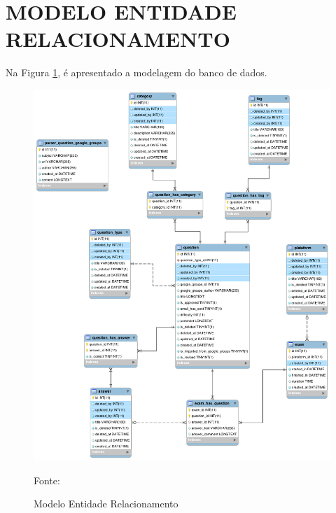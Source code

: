 \section{MODELO ENTIDADE RELACIONAMENTO}

Na Figura \ref{fig:modeloEntidadeRelacionamento}, é apresentado a modelagem do
banco de dados.

\begin{figure}[h!tb]
	\caption{Modelo Entidade Relacionamento}
	\label{fig:modeloEntidadeRelacionamento}

	\centering
	\includegraphics[width=\textwidth]{images/zcpe-reverse-engineer-database.png}

	\centering
	\footnotesize Fonte: \fonteOAutor
\end{figure}

\FloatBarrier 	%
